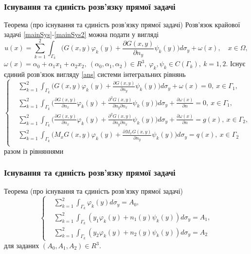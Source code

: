 \documentclass[10pt]{beamer}
\begin{document}
\begin{frame}
\frametitle{Існування та єдиність розв'язку прямої задачі}
\tiny

\begin{block}{Теорема (про існування та єдиність розв'язку прямої задачі)}
Розв'язок крайової задачі \eqref{mainSys}-\eqref{mainSys2} можна подати у вигляді
\begin{equation}
\label{ans}
	 	u(x)=\sum_{k=1}^{2}\int_{\Gamma_k}\bigg(G(x,y)\varphi_k(y)+\frac{\partial G(x,y)}{\partial n_y}\psi_k(y)\bigg)d\sigma_y+\omega(x), \quad x\in \Omega,
\end{equation}
$\omega(x) = \alpha_0+\alpha_1x_1+\alpha_2x_2, \ (\alpha_0,\alpha_1,\alpha_2)\in R^3, \ \varphi_k,\psi_k\in C(\Gamma_k), \ k=1,2$.
Існує єдиний розв'язок вигляду \eqref{ans} системи інтегральних рівнянь
\begin{equation}
	 \left\{
	 	\begin{split}
		\label{integralSystem}
	 		&\sum_{k=1}^{2}\int_{\Gamma_k}\bigg(G(x,y)\varphi_k(y)+\frac{\partial G(x,y)}{\partial n_y}\psi_k(y)\bigg)d\sigma_y+\omega(x)=0, \ x\in\Gamma_1, \\
			&\sum_{k=1}^{2}\int_{\Gamma_k}\bigg(\frac{\partial G(x,y)}{\partial n_x}\varphi_k(y)+\frac{\partial^2 G(x,y)}{\partial n_y\partial n_x}\psi_k(y)\bigg)d\sigma_y+\frac{\partial\omega(x)}{\partial n}=0, \ x\in\Gamma_1,  \\
			&\sum_{k=1}^{2}\int_{\Gamma_k}\bigg(\frac{\partial G(x,y)}{\partial n_x}\varphi_k(y)+\frac{\partial^2 G(x,y)}{\partial n_y\partial n_x}\psi_k(y)\bigg)d\sigma_y+\frac{\partial\omega(x)}{\partial n}=g(x), \ x\in\Gamma_2,  \\
			&\sum_{k=1}^{2}\int_{\Gamma_k}\bigg(M_x G(x,y)\varphi_k(y)+\frac{\partial M_x G(x,y)}{\partial n_y}\psi_k(y)\bigg)d\sigma_y=q(x), \ x\in\Gamma_2  \\
		\end{split}
	\right.
\end{equation}
 разом із рівняннями

\end{block}

\end{frame}

\begin{frame}
\frametitle{Існування та єдиність розв'язку прямої задачі}

\begin{block}{Теорема (про існування та єдиність розв'язку прямої задачі)}
\begin{equation}
	 \left\{
	 	\begin{split}
		\label{system}
			&\sum_{k=1}^{2}\int_{\Gamma_k}\varphi_k(y)d\sigma_y=A_0, \\
			&\sum_{k=1}^{2}\int_{\Gamma_k}(y_1\varphi_k(y)+n_1(y)\psi_k(y))d\sigma_y=A_1, \\
			&\sum_{k=1}^{2}\int_{\Gamma_k}(y_2\varphi_k(y)+n_2(y)\psi_k(y))d\sigma_y=A_2
		\end{split}
	\right.
\end{equation}
для заданих $(A_0,A_1,A_2)\in R^3$.
\end{block}

\end{frame}
\end{document}
